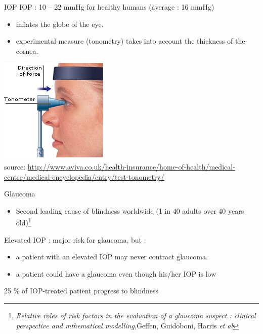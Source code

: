 \begin{frame}{IOP}
IOP : 10 -- 22 mmHg for healthy humans (average : 16 mmHg)
\begin{itemize}
\item inflates the globe of the eye.
\item experimental measure (tonometry) takes into account the thickness of the cornea.
\end{itemize}
%
%
\begin{center}
\includegraphics[scale=.6]{Tonometry.jpg}\\
\tiny{source: \url{http://www.aviva.co.uk/health-insurance/home-of-health/medical-centre/medical-encyclopedia/entry/test-tonometry/}}
\end{center}
\end{frame}

\begin{frame}{Glaucoma}
\begin{itemize}
\item Second leading cause of blindness worldwide (1 in 40 adults over 40 years old)\footnote{\textit{Relative roles of risk factors in the evaluation of a glaucoma suspect : clinical perspective and mthematical modelling},Geffen, Guidoboni, Harris \textit{et al}}
\end{itemize}
Elevated IOP : major risk for glaucoma, but :
\begin{itemize}
\item a patient with an elevated IOP may never contract glaucoma.
\item a patient could have a glaucoma even though his/her IOP is low
\end{itemize}
\begin{center}
\alert{ 25 \% of IOP-treated patient progress to blindness}

\end{center}

\end{frame}

